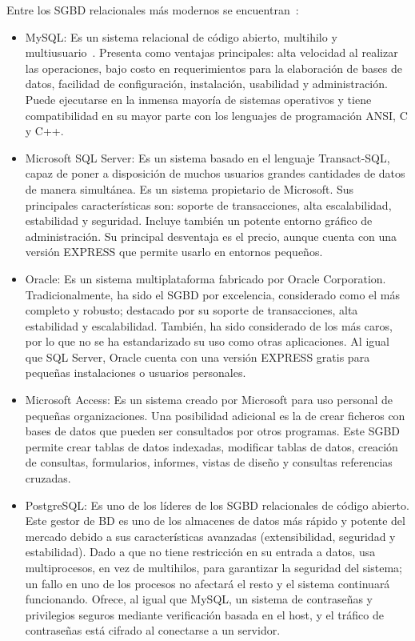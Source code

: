 Entre los SGBD relacionales más modernos se encuentran~\cite{Losgesto13}:
\begin{itemize}
    \item MySQL: Es un sistema relacional de código abierto, multihilo y multiusuario~\cite{ian2003biblia}. Presenta como ventajas principales: alta velocidad al realizar las operaciones, bajo costo en requerimientos para la elaboración de bases de datos, facilidad de configuración, instalación, usabilidad y administración. Puede ejecutarse en la inmensa mayoría de sistemas operativos y tiene compatibilidad en su mayor parte con los lenguajes de programación ANSI, C y C++.
    
    \item Microsoft SQL Server: Es un sistema basado en el lenguaje Transact-SQL, capaz de poner a disposición de muchos usuarios grandes cantidades de datos de manera simultánea. Es un sistema propietario de Microsoft. Sus principales características son: soporte de transacciones, alta escalabilidad, estabilidad y seguridad. Incluye también un potente entorno gráfico de administración. Su principal desventaja es el precio, aunque cuenta con una versión EXPRESS que permite usarlo en entornos pequeños.
    
    \item Oracle: Es un sistema multiplataforma fabricado por Oracle Corporation. Tradicionalmente, ha sido el SGBD por excelencia, considerado como el más completo y robusto; destacado por su soporte de transacciones, alta estabilidad y escalabilidad. También, ha sido considerado de los más caros, por lo que no se ha estandarizado su uso como otras aplicaciones. Al igual que SQL Server, Oracle cuenta con una versión EXPRESS gratis para pequeñas instalaciones o usuarios personales.
    
    \item Microsoft Access: Es un sistema creado por Microsoft para uso personal de pequeñas organizaciones. Una posibilidad adicional es la de crear ficheros con bases de datos que pueden ser consultados por otros programas. Este SGBD permite crear tablas de datos indexadas, modificar tablas de datos, creación de consultas, formularios, informes, vistas de diseño y consultas referencias cruzadas.
    
    \item PostgreSQL: Es uno de los líderes de los SGBD relacionales de código abierto. Este gestor de BD es uno de los almacenes de datos más rápido y potente del mercado debido a sus características avanzadas (extensibilidad, seguridad y estabilidad). Dado a que no tiene restricción en su entrada a datos, usa multiprocesos, en vez de multihilos, para garantizar la seguridad del sistema; un fallo en uno de los procesos no afectará el resto y el sistema continuará funcionando. Ofrece, al igual que MySQL, un sistema
    de contraseñas y privilegios seguros mediante verificación basada en el host, y el tráfico de contraseñas está cifrado al conectarse a un servidor.


\end{itemize}
